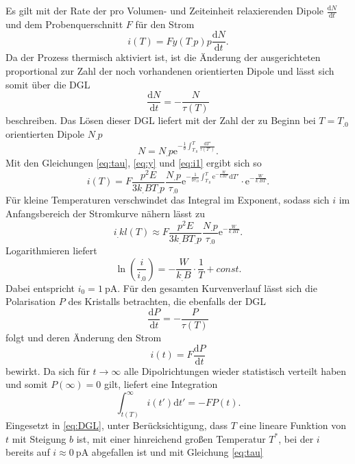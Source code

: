 Es gilt mit der Rate der pro Volumen- und Zeiteinheit relaxierenden Dipole $\frac{\mathrm{d}N}{\mathrm{d}t}$ und dem Probenquerschnitt $F$ für den Strom
\begin{equation}
i(T)=F y(T_.p)p\frac{\mathrm{d}N}{\mathrm{d}t}\text{.}\label{eq:i1}
\end{equation}
Da der Prozess thermisch aktiviert ist, ist die Änderung der ausgerichteten proportional zur Zahl der noch vorhandenen orientierten Dipole und lässt sich somit über die DGL
\[
\frac{\mathrm{d}N}{\mathrm{d}t}=-\frac{N}{\tau(T)}
\]
beschreiben.
Das Lösen dieser DGL liefert mit der Zahl der zu Beginn bei $T=T_.0$ orientierten Dipole $N_.p$
\begin{equation}
N=N_.p\mathrm{e}^{-\frac{1}{b}\int_{T_.0}^T\frac{\mathrm{d}T'}{\tau(T')}}\text{.}\label{eq:N}
\end{equation}
Mit den Gleichungen \eqref{eq:tau}, \eqref{eq:y} und \eqref{eq:i1} ergibt sich so
\begin{equation}
i(T)=F\frac{p^2E}{3k_.BT_.p}\frac{N_.p}{\tau_.0}\mathrm{e}^{-\frac{1}{b\tau_.0}\int_{T_.0}^T\mathrm{e}^{-\frac{W}{k_.BT'}}\mathrm{d}T'}\cdot \mathrm{e}^{-\frac{W}{k_.BT}}\text{.}\label{eq:i2}
\end{equation}
Für kleine Temperaturen verschwindet das Integral im Exponent, sodass sich $i$ im Anfangsbereich der Stromkurve nähern lässt zu
\begin{equation}
i_.{kl}(T)\approx F\frac{p^2E}{3k_.BT_.p}\frac{N_.p}{\tau_.0}\mathrm{e}^{-\frac{W}{k_.BT}}\text{.}\label{eq:i_kl}
\end{equation}
Logarithmieren liefert 
\begin{equation}
\ln\left(\frac{i}{i_.0}\right)=-\frac{W}{k_.B}\cdot\frac{1}{T}+const\text{.}\label{eq:ln1}
\end{equation}
Dabei entspricht $i_0=\SI{1}{\pico\ampere}$. Für den gesamten Kurvenverlauf lässt sich die Polarisation $P$ des Kristalls betrachten, die ebenfalls der DGL
\begin{equation}
\frac{\mathrm{d}P}{\mathrm{d}t}=-\frac{P}{\tau(T)}\label{eq:DGL}
\end{equation}
folgt und deren Änderung den Strom
\[
i(t)=F\frac{\mathrm{d}P}{\mathrm{d}t}
\]
bewirkt. Da sich für $t\rightarrow\infty$ alle Dipolrichtungen wieder statistisch verteilt haben und somit $P(\infty)=0$ gilt, liefert eine Integration
\[
\int_{t(T)}^{\infty}i(t')\mathrm{d}t'=-F P(t)\text{.}
\]
Eingesetzt in \eqref{eq:DGL}, unter Berücksichtigung, dass $T$ eine lineare Funktion von $t$ mit Steigung $b$ ist, mit einer hinreichend großen Temperatur $T^*$, bei der $i$ bereits auf $i\approx\SI{0}{\pico\ampere}$ abgefallen ist und mit Gleichung \eqref{eq:tau}
